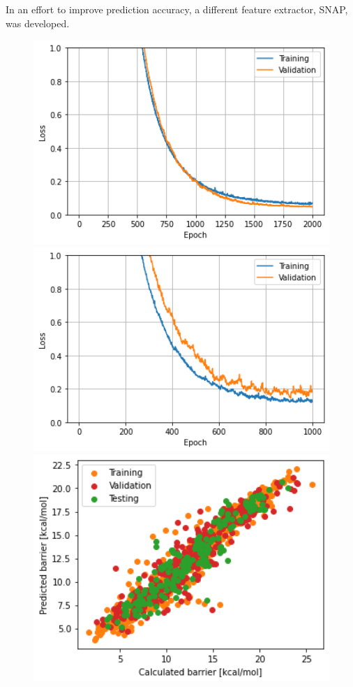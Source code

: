 In an effort to improve prediction accuracy, a different feature extractor, SNAP, was developed.

\begin{figure}[b]
      \includegraphics[width=1.0\textwidth]{figures/regression/fourier/transfer/lossTransferAutocor.png}
    \endminipage\hfill
      \includegraphics[width=1.0\textwidth]{figures/regression/fourier/transfer/lossTransferFull.png}
    \endminipage\hfill
      \includegraphics[width=1.0\textwidth]{figures/regression/fourier/transfer/scatterTransferFull.png}

\end{figure}
